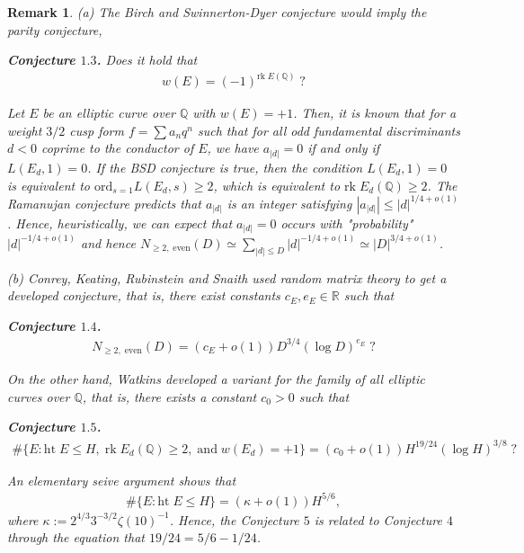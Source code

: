 \documentclass[12pt,reqno]{amsart}
\def\R {{\mathbb R}} \def\RR {{\mathbb R}}
\newtheorem{remark}[thm]{Remark}
\numberwithin{equation}{section}
\def\RR{{\mathbb R}}
\def\R{{\mathbb R}}
\def\Q{{\mathbb Q}}
\begin{document}
\begin{remark}
{\rm
(a) The Birch and Swinnerton-Dyer conjecture would imply the parity conjecture,

\smallskip

{\bf Conjecture $\mathbf{1.3}$.} Does it hold that
\begin{align*}
w(E) = (-1)^{\text{rk} \; E(\Q)} \; ?
\end{align*}

\smallskip

Let $E$ be an elliptic curve over $\Q$ with $w(E) = +1$. Then, it is known that for a weight $3/2$ cusp form $f = \sum a_nq^n$ such that for all odd fundamental discriminants $d<0$ coprime to the conductor of $E$, we have $a_{|d|} = 0$ if and only if $L(E_d, 1) = 0$. If the BSD conjecture is true, then the condition $L(E_d,1)=0$ is equivalent to $\text{ord}_{s=1} L(E_d, s) \ge 2$, which is equivalent to $\text{rk} \; E_d(\Q) \ge 2$. The Ramanujan conjecture predicts that $a_|d|$ is an integer satisfying $|a_|d|| \le |d|^{1/4 + o(1)}$. Hence, heuristically, we can expect that $a_|d| = 0$ occurs with "probability" $|d|^{-1/4+o(1)}$ and hence $N_{\ge 2, \; \text{even}}(D)  \simeq \sum_{|d| \le D} |d|^{-1/4+o(1)} \simeq |D|^{3/4 + o(1)}$.

\smallskip

(b) Conrey, Keating, Rubinstein and Snaith used random matrix theory to get a developed conjecture, that is, there exist constants $c_E, e_E \in \R$ such that

\smallskip
{\bf Conjecture $\mathbf{1.4}$.}
\begin{align*}
N_{\ge 2, \; \text{even}}(D) = (c_E + o(1))D^{3/4} (\log D)^{e_E}\; ?
\end{align*}

On the other hand, Watkins developed a variant for the family of all elliptic curves over $\Q$, that is, there exists a constant $c_0>0$ such that

\smallskip
{\bf Conjecture $\mathbf{1.5}$.}
\begin{align*}
\# \{E: \text{ht} \; E \le H, \; \text{rk} \; E_d(\Q) \ge 2, \;\text{and} \; w(E_d) = +1 \} =  (c_0 + o(1)) H^{19/24} (\log H)^{3/8}\; ?
\end{align*}

\smallskip

An elementary seive argument shows that 
\begin{align*}
\# \{E: \text{ht} \; E \le H\} = (\kappa + o(1))H^{5/6},
\end{align*}
where $\kappa:=2^{4/3}3^{-3/2} \zeta(10)^{-1}$. Hence, the Conjecture $5$ is related to Conjecture $4$ through the equation that $19/24 = 5/6 - 1/24$.

\smallskip

}
\end{remark}
\end{document}
